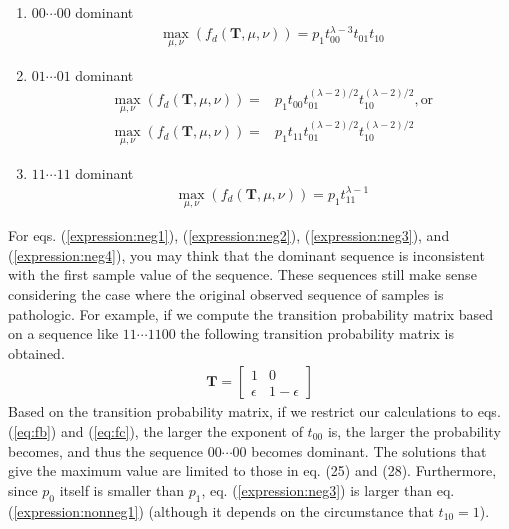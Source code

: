 ﻿\documentclass[a4paper,xelatex,english]{bxjsarticle}
\newcommand\mib[1]{\boldsymbol{#1}}
\begin{document}
\begin{enumerate}[{d)}-i)]
	\item $00 \cdots 00$ dominant 
	\begin{align}
	\max_{\mu, \nu}(f_{d}(\mib{T}, \mu, \nu)) = p_{1} t_{00}^{\lambda - 3} t_{01} t_{10} \label{expression:neg4}
	\end{align}
	\item $01 \cdots 01$ dominant 
	\begin{align}
	\max_{\mu, \nu}(f_{d}(\mib{T}, \mu, \nu)) = & p_{1} t_{00} t_{01}^{(\lambda - 2) / 2} t_{10}^{(\lambda - 2) / 2}, {\textrm{or}} \\
	\max_{\mu, \nu}(f_{d}(\mib{T}, \mu, \nu)) = & p_{1} t_{11} t_{01}^{(\lambda - 2) / 2} t_{10}^{(\lambda - 2) / 2}
	\end{align}
	\item $11 \cdots 11$ dominant 
	\begin{align}
	\max_{\mu, \nu}(f_{d}(\mib{T}, \mu, \nu)) = p_{1} t_{11}^{\lambda - 1}
	\end{align}
\end{enumerate}

For eqs. (\ref{expression:neg1}), (\ref{expression:neg2}), (\ref{expression:neg3}), and (\ref{expression:neg4}), you may think that the dominant sequence is inconsistent with the first sample value of the sequence. 
These sequences still make sense considering the case where the original observed sequence of samples is pathologic. 
For example, if we compute the transition probability matrix based on a sequence like $11 \cdots 1100$ the following transition probability matrix is obtained.
\begin{align}
\mib{T} 
= 
\begin{bmatrix}
1 & 0 \\
\epsilon & 1 - \epsilon 
\end{bmatrix}
\end{align}
Based on the transition probability matrix, if we restrict our calculations to eqs. (\ref{eq:fb}) and (\ref{eq:fc}), the larger the exponent of $t_{00}$ is, the larger the probability becomes, and thus the sequence $00 \cdots 00$ becomes dominant.  
The solutions that give the maximum value are limited to those in eq. (25) and (28). Furthermore, since $p_{0}$ itself is smaller than $p_{1}$, eq. (\ref{expression:neg3}) is larger than eq. (\ref{expression:nonneg1}) (although it depends on the circumstance that $t_{10} = 1$).
\end{document}
